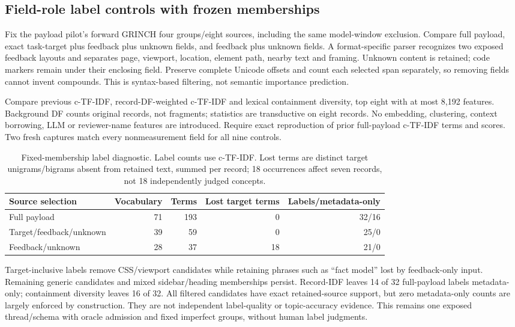 \documentclass[11pt]{article}
\begin{document}
\subsection{Field-role label controls with frozen memberships}
Fix the payload pilot's forward GRINCH four groups/eight sources, including the
same model-window exclusion. Compare full payload, exact task-target plus feedback
plus unknown fields, and feedback plus unknown fields. A format-specific parser
recognizes two exposed feedback layouts and separates page, viewport, location,
element path, nearby text and framing. Unknown content is retained; code markers
remain under their enclosing field. Preserve complete Unicode offsets and count
each selected span separately, so removing fields cannot invent compounds.
This is syntax-based filtering, not semantic importance prediction.

Compare previous c-TF-IDF, record-DF-weighted c-TF-IDF and lexical containment
diversity, top eight with at most 8,192 features. Background DF counts original
records, not fragments; statistics are transductive on eight records. No embedding,
clustering, context borrowing, LLM or reviewer-name features are introduced.
Require exact reproduction of prior full-payload c-TF-IDF terms and scores.
Two fresh captures match every nonmeasurement field for all nine controls.

\begin{table}[htbp]
\centering\small
\begin{tabular}{lrrrr}
\hline
Source selection & Vocabulary & Terms & Lost target terms & Labels/metadata-only\\
\hline
Full payload & 71 & 193 & 0 & 32/16\\
Target/feedback/unknown & 39 & 59 & 0 & 25/0\\
Feedback/unknown & 28 & 37 & 18 & 21/0\\
\hline
\end{tabular}
\caption{Fixed-membership label diagnostic. Label counts use c-TF-IDF. Lost terms
are distinct target unigrams/bigrams absent from retained text, summed per record;
18 occurrences affect seven records, not 18 independently judged concepts.}
\end{table}

Target-inclusive labels remove CSS/viewport candidates while retaining phrases
such as ``fact model'' lost by feedback-only input. Remaining generic candidates
and mixed sidebar/heading memberships persist. Record-IDF leaves 14 of 32
full-payload labels metadata-only; containment diversity leaves 16 of 32.
All filtered candidates have exact retained-source support, but zero metadata-only
counts are largely enforced by construction. They are not independent label-quality
or topic-accuracy evidence. This remains one exposed thread/schema with oracle
admission and fixed imperfect groups, without human label judgments.
\end{document}
